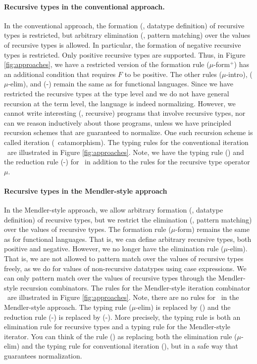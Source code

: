 \paragraph{Recursive types in the conventional approach.}
In the conventional approach, the formation (\ie, datatype definition) of
recursive types is restricted, but arbitrary elimination (\ie, pattern matching)
over the values of recursive types is allowed. In particular, the formation of
negative recursive types is restricted. Only positive recursive types are
supported. Thus, in Figure \ref{fig:approaches}, we have a restricted version of
the formation rule {\small($\mu$-form$^{+}$)} has an additional condition that
requires $F$ to be positive. The other rules {\small($\mu$-intro)},
{\small($\mu$-elim)}, and {\small(\unIn-\In)} remain the same as for
functional languages. Since we have restricted the recursive types
at the type level and we do not have general recursion at the term level,
the language is indeed normalizing. However, we cannot write
interesting (\ie, recursive) programs that involve recursive types, nor
can we reason inductively about those programs, unless we have principled recursion
schemes that are guaranteed to normalize. One such recursion scheme is called
iteration (\aka\ catamorphism). The typing rules for the conventional iteration
\It\ are illustrated in Figure \ref{fig:approaches}. Note, we have the typing
rule {\small(\It)} and the reduction rule {\small(\It-\In)} for \It\,
in addition to the rules for the recursive type operator $\mu$.

\paragraph{Recursive types in the Mendler-style approach}
In the Mendler-style approach, we allow arbitrary formation
(\ie, datatype definition) of recursive types, but we restrict
the elimination (\ie, pattern matching) over the values of recursive types. 
The formation rule {\small($\mu$-form)} remains the same as
for functional languages. That is, we can define arbitrary recursive types,
both positive and negative. However, we no longer have the elimination
rule {\small($\mu$-elim)}. That is, we are not allowed to pattern match over
the values of recursive types freely, as we do for values of non-recursive
datatypes using case expressions. We can only pattern match over
the values of recursive types through the Mendler-style recursion
combinators. The rules for the Mendler-style iteration combinator \MIt\
are illustrated in Figure \ref{fig:approaches}.
Note, there are no rules for \unIn\ in the Mendler-style approach.
The typing rule {\small($\mu$-elim)} is replaced by {\small(\MIt)} and
the reduction rule {\small(\unIn-\In)} is replaced by {\small(\MIt-\In)}.
More precisely, the typing rule {\small \MIt} is both an elimination rule
for recursive types and a typing rule for the Mendler-style iterator.
You can think of the rule {\small(\MIt)} as replacing both the elimination rule
{\small($\mu$-elim)} and the typing rule for conventional iteration
{\small(\It)}, but in a safe way that guarantees normalization.

